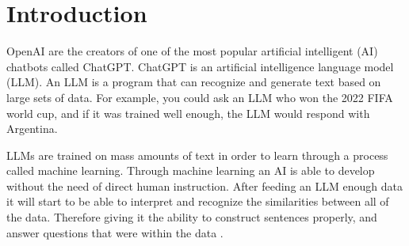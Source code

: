 \section{Introduction}
\label{sec:ai}


OpenAI are the creators of one of the most popular artificial intelligent (AI) chatbots called ChatGPT. ChatGPT is an artificial intelligence language model (LLM). An LLM is a program that can recognize and generate text based on large sets of data. For example, you could ask an LLM who won the 2022 FIFA world cup, and if it was trained well enough, the LLM would respond with Argentina. 
   
LLMs are trained on mass amounts of text in order to learn through a process called machine learning. Through machine learning an AI is able to develop without the need of direct human instruction. After feeding an LLM enough data it will start to be able to interpret and recognize the similarities between all of the data. Therefore giving it the ability to construct sentences properly, and answer questions that were within the data \citep{ChatGPT-functions} \cite{LLM}.
